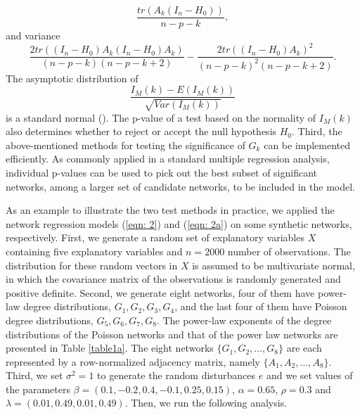 \documentclass[times, doublespace]{auth}
\begin{document}
\[
\dfrac{tr(A_{k}(I_{n}-H_{0}))}{n-p-k},
\]
and variance 
\[
\dfrac{2tr((I_{n}-H_{0})A_{k}(I_{n}-H_{0})A_{k})}{(n-p-k)(n-p-k+2)} - \dfrac{2tr((I_{n}-H_{0})A_{k})^{2}}{(n-p-k)^{2}(n-p-k+2)}.
\]
The asymptotic distribution of 
\[
\dfrac{I_{M}(k) - E(I_{M}(k))}{\sqrt{Var(I_{M}(k))}}
\]
is a standard normal (\cite{R8}). The p-value of a test based on the normality of $I_{M}(k)$ also determines whether to reject or accept the null hypothesis $H_{0}$. Third, the above-mentioned methods for testing the significance of $G_{k}$ can be implemented efficiently. As commonly applied in a standard multiple regression analysis, individual p-values can be used to pick out the best subset of significant networks, among a larger set of candidate networks, to be included in the model.  
\newline

As an example to illustrate the two test methods in practice, we applied the network regression models (\ref{eqn: 2}) and (\ref{eqn: 2a}) on some synthetic networks, respectively. First, we generate a random set of explanatory variables $X$ containing five explanatory variables and $n=2000$ number of observations. The distribution for these random vectors in $X$ is assumed to be multivariate normal, in which the covariance matrix of the observations is randomly generated and positive definite. Second, we generate eight networks, four of them have power-law degree distributions, $G_{1}, G_{2}, G_{3}, G_{4}$, and the last four of them have Poisson degree distributions, $G_{5}, G_{6}, G_{7}, G_{8}$.  The power-law exponents of the degree distributions of the Poisson networks and that of the power law networks are presented in Table \ref{table1a}. The eight networks $\{G_{1}, G_{2}, \ldots, G_{8}\}$ are each represented by a row-normalized adjacency matrix, namely $\{A_{1},A_{2},\ldots,A_{8}\}$. Third, we set $\sigma^{2} = 1$ to generate the random disturbances $e$ and we set values of the parameters $\beta = (0.1,-0.2,0.4,-0.1,0.25,0.15)$, $\alpha = 0.65$, $\rho = 0.3$ and $\lambda = (0.01,0.49,0.01,0.49)$. Then, we run the following analysis.
\end{document}
